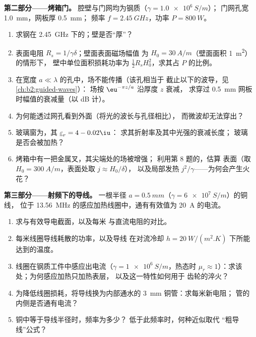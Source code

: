 \begin{problem}
\medskip
\noindent\textbf{第二部分——烤箱门。}
腔壁与门网均为钢质（$\gamma = \qty{1.0e6}{S/m}$）；
门网孔宽 \qty{1.0}{mm}，网板厚 \qty{0.5}{mm}；
频率 $f = \qty{2.45}{GHz}$，功率 $P = \qty{800}{W}$。
\begin{enumerate}[resume]
  \item 求钢在 \qty{2.45}{GHz} 下的；壁是否“厚”？
  \item 表面电阻 $R_s = 1/\gamma\delta$；壁面表面磁场幅值
        为 $H_0 = \qty{30}{A/m}$（壁面面积 \qty{1}{m^2}）的情形下，
        壁中单位面积损耗功率为 $\tfrac12R_sH_0^2$，求其占
        $P$ 的比例。
  \item 在宽度 $a \ll \lambda$ 的孔中，场不能传播（该孔相当于
        截止以下的波导，见\cref{ch:b2:guided-waves}）：
        场按 $\eu^{-\pi z/a}$ 沿厚度 $z$ 衰减，
        求穿过 \qty{0.5}{mm} 网板时幅值的衰减量（以 dB 计）。
  \item 为何能透过网孔看到外面（将光的波长与孔径相比），
        而微波却无法穿出？
  \item 玻璃窗为，其 $\underline\varepsilon_r = 4 - 0.02\iu$：
        求其折射率及其中光强的衰减长度；
        玻璃是否会被加热？
  \item 烤箱中有一把金属叉，其尖端处的场被增强；
        利用第 8 题的，估算
        表面（取 $H_0 = \qty{300}{A/m}$，表面处取 $j \approx H_0/\delta$），
        以及局部发热 $j^2/\gamma$——为何会产生火花？
\end{enumerate}

\medskip
\noindent\textbf{第三部分——射频下的导线。}
一根半径 $a = \qty{0.5}{mm}$（$\gamma = \qty{6e7}{S/m}$）的铜线，
位于 \qty{13.56}{MHz} 的感应加热线圈中，通有有效值为 \qty{20}{A} 的电流。
\begin{enumerate}[resume]
  \item 求与有效导电截面，以及每米
        与直流电阻的对比。
  \item 每米线圈导线耗散的功率，以及导线
        在对流冷却 $h = \qty{20}{W/(m^2.K)}$ 下所能达到的温度。
  \item 线圈在钢质工件中感应出电流（$\gamma =
        \qty{1e6}{S/m}$，热态时 $\mu_r \approx 1$）：求该处；为何感应加热只加热表层，
        以及这一特性如何用于
        齿轮的淬火？
  \item 为降低线圈损耗，将导线换为内部通水的 \qty{3}{mm}
        铜管：求每米新电阻；
        管的内侧是否通有电流？
  \item 铜中等于导线半径时，频率为多少？
        低于此频率时，何种近似取代
        “粗导线”公式？
\end{enumerate}


\end{problem}
